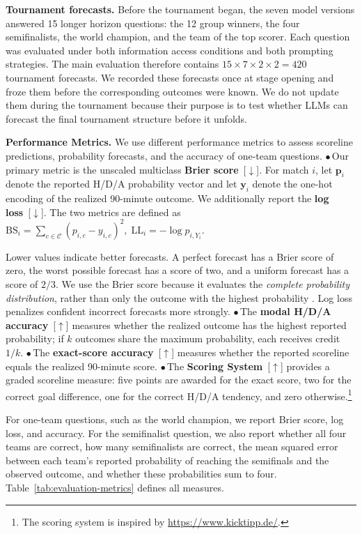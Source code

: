 \documentclass[sigconf,nonacm]{acmart}
\begin{document}
\textbf{Tournament forecasts.} Before the tournament began, the seven model versions answered 15 longer horizon questions: the 12 group winners, the four semifinalists, the world champion, and the team of the top scorer. Each question was evaluated under both information access conditions and both prompting strategies. The main evaluation therefore contains $15 \times 7 \times 2 \times 2 = 420$ tournament forecasts. We recorded these forecasts once at stage opening and froze them before the corresponding outcomes were known. We do not update them during the tournament because their purpose is to test whether LLMs can forecast the final tournament structure before it unfolds. 

\textbf{Performance Metrics.} We use different performance metrics to assess scoreline predictions, probability forecasts, and the accuracy of one-team questions. $\bullet$\,Our primary metric is the unscaled multiclass \textbf{Brier score}~[$\downarrow$]. For match $i$, let $\mathbf{p}_i$ denote the reported H/D/A probability vector and let $\mathbf{y}_i$ denote the one-hot encoding of the realized 90-minute outcome. We additionally report the \textbf{log loss}~[$\downarrow$]. The two metrics are defined as
$\mathrm{BS}_i = 
   \sum_{c\in\mathcal{C}}
     \left(p_{i,c}-y_{i,c}\right)^2,
\;
\mathrm{LL}_i = 
   -\log p_{i,Y_i}.$

Lower values indicate better forecasts. A perfect forecast has a Brier score of zero, the worst possible forecast has a score of two, and a uniform forecast has a score of $2/3$. We use the Brier score because it evaluates the \emph{complete probability distribution}, rather than only the outcome with the highest probability \citep{brier_1950,gneiting_raftery_2007}. Log loss penalizes confident incorrect forecasts more strongly. $\bullet$\,The \textbf{modal H/D/A accuracy}~[$\uparrow$] measures whether the realized outcome has the highest reported probability; if $k$ outcomes share the maximum probability, each receives credit $1/k$. $\bullet$\,The \textbf{exact-score accuracy}~[$\uparrow$] measures whether the reported scoreline equals the realized 90-minute score. $\bullet$\,The \textbf{Scoring System}~[$\uparrow$] provides a graded scoreline measure: five points are awarded for the exact score, two for the correct goal difference, one for the correct H/D/A tendency, and zero otherwise.\footnote{The scoring system is inspired by \url{https://www.kicktipp.de/}.}

For one-team questions, such as the world champion, we report Brier score, log loss, and accuracy. For the semifinalist question, we also report whether all four teams are correct, how many semifinalists are correct, the mean squared error between each team's reported probability of reaching the semifinals and the observed outcome, and whether these probabilities sum to four. Table~\ref{tab:evaluation-metrics} defines all measures.
\end{document}
